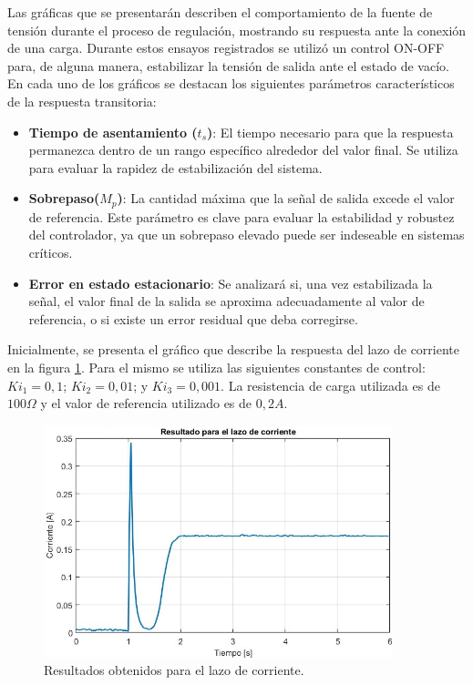 Las gráficas que se presentarán describen el comportamiento de la fuente de tensión durante el proceso de regulación, mostrando su respuesta ante la conexión de una carga. Durante estos ensayos registrados se utilizó un control ON-OFF para, de alguna manera, estabilizar la tensión de salida ante el estado de vacío. En cada uno de los gráficos se destacan los siguientes parámetros característicos de la respuesta transitoria:
\begin{itemize}
	\item \textbf{Tiempo de asentamiento ($t_s$)}: El tiempo necesario para que la respuesta permanezca dentro de un rango específico alrededor del valor final. Se utiliza para evaluar la rapidez de estabilización del sistema.
	\item \textbf{Sobrepaso($M_p$)}: La cantidad máxima que la señal de salida excede el valor de referencia. Este parámetro es clave para evaluar la estabilidad y robustez del controlador, ya que un sobrepaso elevado puede ser indeseable en sistemas críticos.
	\item \textbf{Error en estado estacionario}: Se analizará si, una vez estabilizada la señal, el valor final de la salida se aproxima adecuadamente al valor de referencia, o si existe un error residual que deba corregirse.
\end{itemize}\par 
Inicialmente, se presenta el gráfico que describe la respuesta del lazo de corriente en la figura \ref{F:Resultados obtenidos para el lazo de corriente}. Para el mismo se utiliza las siguientes constantes de control: $Ki_1=0,1$; $Ki_2=0,01$; y $Ki_3=0,001$. La resistencia de carga utilizada es de $100 \Omega$ y el valor de referencia utilizado es de $0,2A$. 
\begin{figure}[htbp]
    \centering
    \includegraphics[width=0.9\textwidth]{./imagenes/NF5_lazo_corriente.jpg}
    \caption{Resultados obtenidos para el lazo de corriente.}
    \label{F:Resultados obtenidos para el lazo de corriente}
\end{figure}\par 
